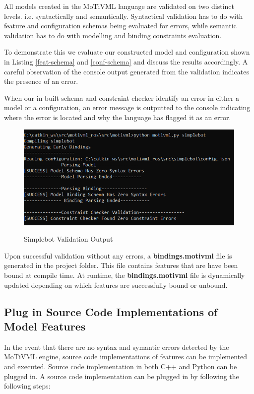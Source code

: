 \documentclass{article}
\begin{document}
All models created in the MoTiVML language are validated on two distinct levels. i.e. syntactically and semantically. Syntactical validation has to do with feature and configuration schemas being evaluated for errors, while semantic validation has to do with modelling and binding constraints evaluation.

To demonstrate this we evaluate our constructed model and configuration shown in Listing \ref{feat-schema} and \ref{conf-schema} and discuss the results accordingly. A careful observation of  the console output generated from the validation indicates the presence of an error. 

When our in-built schema and constraint checker identify an error in either a model or a configuration, an error message is outputted to the console indicating where the error is located and why the language has flagged it as an error.

\begin{figure}[H]
	\caption{Simplebot Validation Output}
	\centering
	\includegraphics[width=\columnwidth]{images/validate.png}
	\label{validation}
\end{figure}

Upon successful validation without any errors, a \textbf{bindings.motivml} file is generated in the project folder. This file contains features that are have been bound at compile time. At runtime, the \textbf{bindings.motivml} file is dynamically updated depending on which features are successfully bound or unbound.

\subsection{Plug in Source Code Implementations of Model Features}
In the event that there are no syntax and symantic errors detected by the MoTiVML engine, source code implementations of features can be implemented and executed. Source code implementation in both C++ and Python can be plugged in. A source code implementation can be plugged in by following the following steps:
\end{document}
